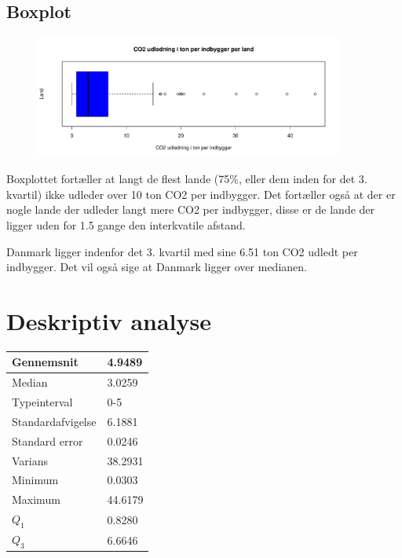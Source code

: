 \documentclass{article}
\begin{document}
\subsection{Boxplot}

\begin{figure}[H]
  \centering
  \includegraphics[width=0.9\textwidth]{co2boxplot.pdf}
\end{figure}

Boxplottet fortæller at langt de flest lande (75\%, eller dem inden for det 3.
kvartil) ikke udleder over 10 ton CO2 per indbygger. Det fortæller også at der
er nogle lande der udleder langt mere CO2 per indbygger, disse er de lande der
ligger uden for 1.5 gange den interkvatile afstand.

Danmark ligger indenfor det 3. kvartil med sine 6.51 ton CO2 udledt per
indbygger. Det vil også sige at Danmark ligger over medianen.

\section{Deskriptiv analyse}
\begin{table}[H]
\begin{tabular}{l|l}
Gennemsnit        & 4.9489  \\\hline
Median            & 3.0259  \\\hline
Typeinterval      & 0-5 \\\hline
Standardafvigelse & 6.1881  \\\hline
Standard error    & 0.0246  \\\hline
Varians           & 38.2931 \\\hline
Minimum           & 0.0303  \\\hline
Maximum           & 44.6179 \\\hline
$Q_1$             & 0.8280  \\\hline
$Q_3$             & 6.6646 
\end{tabular}
\end{table}
\end{document}
